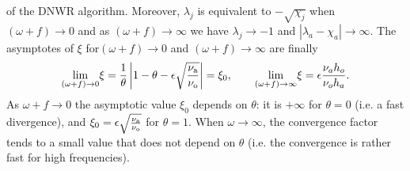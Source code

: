  of the DNWR algorithm.
Moreover, $\lambda_j$ is equivalent to $-\sqrt{\chi_j}$ when
$(\omega+f) \rightarrow 0$ and
as $(\omega+f) \rightarrow \infty$ we have
$\lambda_j\rightarrow -1$ and
$|\lambda_a - \chi_a| \rightarrow \infty$. The asymptotes
of $\xi$ for$(\omega+f) \rightarrow 0$ and
$(\omega+f) \rightarrow \infty$ are finally
\[
 \underset{(\omega+f) \rightarrow 0}{\mathrm{lim}} \xi = \frac{1}{\theta} \left| 1-\theta-\epsilon \sqrt{\frac{\nu_{\rm a}}{\nu_{\rm o}}}  \right| = \xi_0, \qquad
 \underset{(\omega+f) \rightarrow \infty}{\mathrm{lim}} \xi =
 \epsilon \frac{\nu_a h_o}{\nu_o h_a}.
\]
As $\omega + f \to 0$ the asymptotic value 
$\xi_0$ depends on $\theta$: it is $+\infty$ for $\theta=0$ (i.e. a fast divergence), and $\xi_0 = \epsilon\sqrt{\frac{\nu_{\rm a}}{\nu_{\rm o}}}$ for $\theta=1$.
When $\omega\to \infty$, the convergence factor tends to a small value
that does not depend on $\theta$
(i.e. the convergence is rather fast for high frequencies).

